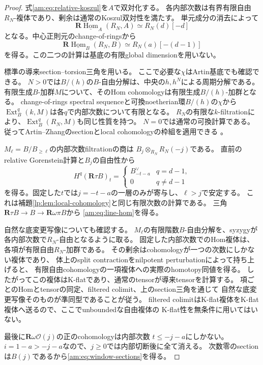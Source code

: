 \begin{proof}
式\eqref{am:eq:relative-koszul}を$A$で双対化する。
各内部次数は有界有限自由$R_N$-複体であり、剰余は通常のKoszul双対性を満たす。
単元成分の消去によって
\[
 \mathbf R\underline{\operatorname{Hom}}_A(R_N,A)
 \simeq R_N(d)[-d]
\]
となる。中心正則元のchange-of-ringsから
\[
 \mathbf R\underline{\operatorname{Hom}}_B(R_N,B)
 \simeq R_N(a)[-(d-1)]
\]
を得る。この二つの計算は基底の有限global dimensionを用いない。

標準の導来section--torsion三角を用いる。
ここで必要な$\chi$はArtin基底でも確認できる。
$N>0$では$B/(h)$の$B$-自由分解は、中央の$h,h^N$による周期分解である。
有限生成$B$-加群$M$について、そのHom cohomologyは有限生成$B/(h)$-加群となる。
change-of-rings spectral sequenceと可換noetherian環$B/(h)$の$\chi$から
$\operatorname{Ext}_B^q(k,M)$は各$q$で内部次数について有限となる。
$R_N$の有限な$k$-filtrationにより、$\operatorname{Ext}_B^q(R_N,M)$も同じ性質を持つ。
$N=0$では通常の可換計算である。
従ってArtin--Zhangのsectionとlocal cohomologyの枠組を適用できる
\cite{LP-AZ}。

$M_\ell=B/B_{\ge\ell}$の内部次数filtrationの商は
$B_j\otimes_{R_N}R_N(-j)$である。
直前のrelative Gorenstein計算と$B_j$の自由性から
\[
 H^q(\mathbf R\tau B)_t=
 \begin{cases}
 B_{-t-a}^{\vee}&q=d-1,\\
 0&q\ne d-1
 \end{cases}
\]
を得る。固定した$t$では$j=-t-a$の一層のみが寄与し、$\ell>j$で安定する。
これは補題\ref{lp:lem:local-cohomology}と同じ有限次数の計算である。
三角$\mathbf R\tau B\to B\to\mathbf R\omega\pi B$から
\eqref{am:eq:line-hom}を得る。

自然な底変更写像についても確認する。
$M_\ell$の有限階数$B$-自由分解を、syzygyが各内部次数で$R_N$-自由となるように取る。
固定した内部次数でのHom複体は、各項が有限自由$R_N$-加群である。
その剰余はcohomologyが一つの次数にしかない複体であり、
体上のsplit contractionをnilpotent perturbationによって持ち上げると、
有限自由cohomologyの一項複体への実際のhomotopy同値を得る。
したがってこの複体はK-flatであり、通常のtensorが導来tensorを計算する。
項ごとのHomとtensorの同定、filtered colimit、上のsection三角を通じて
自然な底変更写像そのものが準同型であることが従う。
filtered colimitはK-flat複体をK-flat複体へ送るので、ここでunboundedな自由複体の
K-flat性を無条件に用いてはいない。

最後に$\mathbf R\omega\mathcal O(j)$の正のcohomologyは内部次数
$t\le-j-a$にしかない。
$i=1-a>-j-a$なので、$j\ge0$では内部切断後に全て消える。
次数零のsectionは$B(j)$であるから\eqref{am:eq:window-sections}を得る。
\end{proof}

